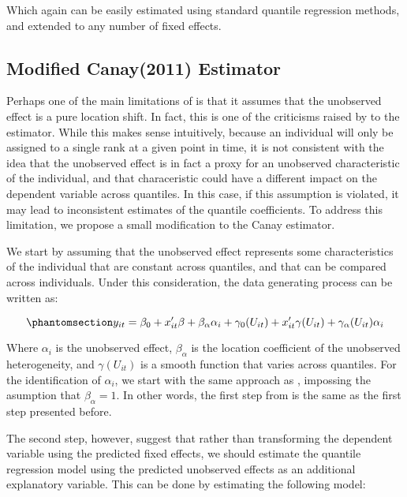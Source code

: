\documentclass[bib]{statapress}
\begin{document}
Which again can be easily estimated using standard quantile regression
methods, and extended to any number of fixed effects.

\subsection{Modified Canay(2011) Estimator}\label{sec-mcanay}

Perhaps one of the main limitations of \citet{canay2011} is that it
assumes that the unobserved effect is a pure location shift. In fact,
this is one of the criticisms raised by \citet{mss2019} to the
estimator. While this makes sense intuitively, because an individual
will only be assigned to a single rank at a given point in time, it is
not consistent with the idea that the unobserved effect is in fact a
proxy for an unobserved characteristic of the individual, and that
characeristic could have a different impact on the dependent variable
across quantiles. In this case, if this assumption is violated, it may
lead to inconsistent estimates of the quantile coefficients. To address
this limitation, we propose a small modification to the Canay estimator.

We start by assuming that the unobserved effect represents some
characteristics of the individual that are constant across quantiles,
and that can be compared across individuals. Under this consideration,
the data generating process can be written as:

\begin{equation}\phantomsection\label{eq-mcanay-dgp}{y_{it} =\beta_0 +   x_{it}'\beta + \beta_\alpha \alpha_i+
\gamma_0(U_{it}) +  x_{it}'\gamma(U_{it}) + \gamma_\alpha(U_{it}) \alpha_i
}\end{equation}

Where \(\alpha_i\) is the unobserved effect, \(\beta_\alpha\) is the
location coefficient of the unobserved heterogeneity, and
\(\gamma(U_{it})\) is a smooth function that varies across quantiles.
For the identification of \(\alpha_i\), we start with the same approach
as \citet{canay2011}, impossing the asumption that \(\beta_\alpha=1\).
In other words, the first step from \citet{canay2011} is the same as the
first step presented before.

The second step, however, suggest that rather than transforming the
dependent variable using the predicted fixed effects, we should estimate
the quantile regression model using the predicted unobserved effects as
an additional explanatory variable. This can be done by estimating the
following model:
\end{document}

